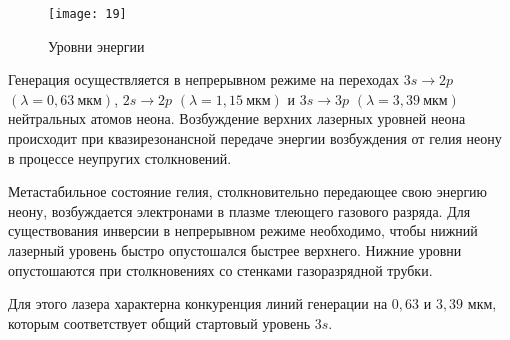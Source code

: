 \begin{figure}[h]
    \center
    \texttt{[image: 19]}
    \caption{Уровни энергии}
\end{figure}
Генерация осуществляется в непрерывном режиме на переходах
\( 3s \rightarrow 2p \) \( (\lambda = 0,63~\text{мкм}) \),
\( 2s \rightarrow 2p \) \( (\lambda = 1,15~\text{мкм}) \) и
\( 3s \rightarrow 3p \) \( (\lambda = 3,39~\text{мкм}) \) нейтральных атомов
неона. Возбуждение верхних лазерных уровней неона происходит при
квазирезонансной передаче энергии возбуждения от гелия неону в процессе
неупругих столкновений.

Метастабильное состояние гелия, столкновительно передающее свою энергию неону, 
возбуждается электронами в плазме тлеющего газового разряда. Для существования 
инверсии в непрерывном режиме необходимо, чтобы нижний лазерный уровень быстро 
опустошался быстрее верхнего. Нижние уровни опустошаются при столкновениях со 
стенками газоразрядной трубки.

Для этого лазера характерна конкуренция линий генерации на \( 0,63 \) и 
\( 3,39 \) мкм, которым соответствует общий стартовый уровень \( 3s \).